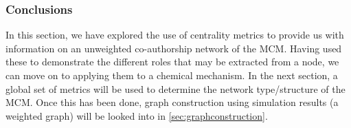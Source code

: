 \subsubsection{Conclusions}
In this section, we have explored the use of centrality metrics to provide us with information on an unweighted co-authorship network of the MCM. Having used these to demonstrate the different roles that may be extracted from a node, we can move on to applying them to a chemical mechanism. In the next section, a global set of metrics will be used to determine the network type/structure of the MCM. Once this has been done, graph construction using simulation results (a weighted graph) will be looked into in \autoref{sec:graphconstruction}. 
% 
% 
% 
% 
